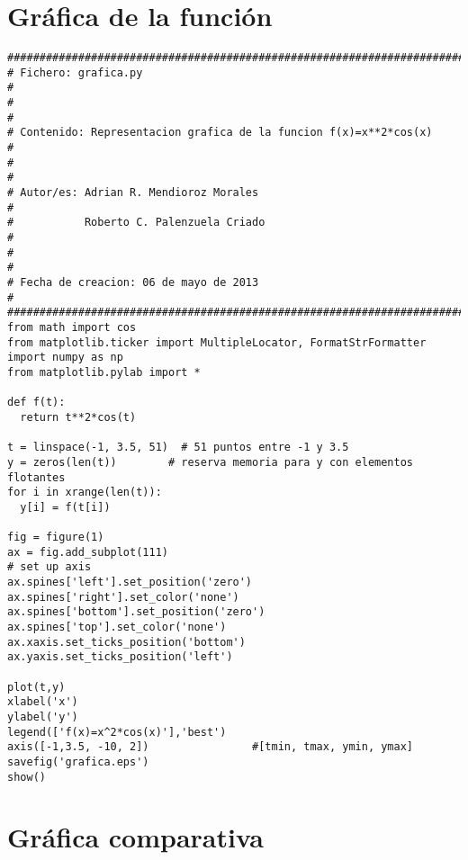 \section{Gr\'afica de la funci\'on}
\label{Apendice1:grafica1}

\begin{center}
\begin{footnotesize}
\begin{verbatim}
########################################################################
# Fichero: grafica.py                                                  #
#                                                                      #
# Contenido: Representacion grafica de la funcion f(x)=x**2*cos(x)     #
#                                                                      #
# Autor/es: Adrian R. Mendioroz Morales                                #
#           Roberto C. Palenzuela Criado                               #
#                                                                      #
# Fecha de creacion: 06 de mayo de 2013                                #
########################################################################
from math import cos
from matplotlib.ticker import MultipleLocator, FormatStrFormatter
import numpy as np
from matplotlib.pylab import *

def f(t):
  return t**2*cos(t)

t = linspace(-1, 3.5, 51)  # 51 puntos entre -1 y 3.5
y = zeros(len(t))        # reserva memoria para y con elementos flotantes
for i in xrange(len(t)):
  y[i] = f(t[i])

fig = figure(1)
ax = fig.add_subplot(111) 
# set up axis
ax.spines['left'].set_position('zero')
ax.spines['right'].set_color('none')
ax.spines['bottom'].set_position('zero')
ax.spines['top'].set_color('none')
ax.xaxis.set_ticks_position('bottom')
ax.yaxis.set_ticks_position('left')
 
plot(t,y)
xlabel('x')
ylabel('y')
legend(['f(x)=x^2*cos(x)'],'best')
axis([-1,3.5, -10, 2])                #[tmin, tmax, ymin, ymax]
savefig('grafica.eps')
show()
\end{verbatim}
\end{footnotesize}
\end{center}

\newpage

\section{Gr\'afica comparativa}
\label{Apendice1:grafica2}

